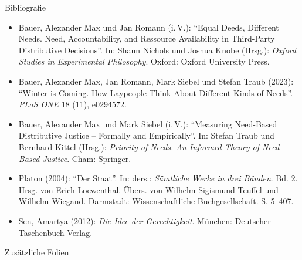 \documentclass[xcolor=table,9pt,aspectratio=169]{beamer}
\begin{document}
\begin{frame}{\vspace*{10mm}Bibliografie}
\vspace*{-10mm}
{\footnotesize
\begin{itemize}[label=,leftmargin=2em,itemindent=-2em]
   \item Bauer, Alexander Max und Jan Romann (i.\,V.): \enquote{Equal Deeds, Different Needs. Need, Accountability, and Ressource Availability in Third-Party Distributive Decisions}. In: Shaun Nichols und Joshua Knobe (Hrsg.): \textit{Oxford Studies in Experimental Philosophy}. Oxford: Oxford University Press.
   \item Bauer, Alexander Max, Jan Romann, Mark Siebel und Stefan Traub (2023): \enquote{Winter is Coming. How Laypeople Think About Different Kinds of Needs}. \textit{PLoS ONE} 18 (11), e0294572.
   \item Bauer, Alexander Max und Mark Siebel (i.\,V.): \enquote{Measuring Need-Based Distributive Justice -- Formally and Empirically}. In: Stefan Traub und Bernhard Kittel (Hrsg.): \textit{Priority of Needs. An Informed Theory of Need-Based Justice}. Cham: Springer.
   \item Platon (2004): \enquote{Der Staat}. In: ders.: \textit{Sämtliche Werke in drei Bänden}. Bd. 2. Hrsg. von Erich Loewenthal. Übers. von Wilhelm Sigismund Teuffel und Wilhelm Wiegand. Darmstadt: Wissenschaftliche Buchgesellschaft. S. 5--407.
   \item Sen, Amartya (2012): \textit{Die Idee der Gerechtigkeit}. München: Deutscher Taschenbuch Verlag.
\end{itemize}
}
\end{frame}


\begin{frame}
\begin{overlayarea}{\textwidth}{0.81\paperheight}{
   \vspace*{11mm}
   \textcolor{uolblue}
   {Zusätzliche Folien}
}
\end{overlayarea}
\end{frame}
\end{document}
